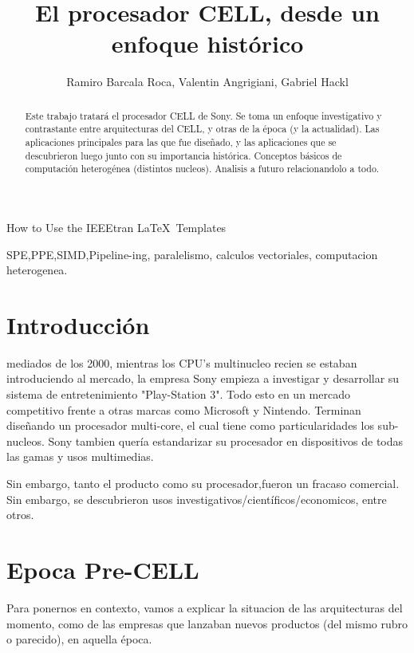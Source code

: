 \documentclass[10pt,compsoc]{IEEEtran}
\begin{document}
	\title{El procesador CELL, desde un enfoque
		histórico}
	\author{Ramiro Barcala Roca, Valentin Angrigiani, Gabriel Hackl}
		
	{How to Use the IEEEtran \LaTeX \ Templates}
	\maketitle
	
	\begin{abstract}
		Este trabajo tratará el procesador CELL de Sony. Se toma un enfoque investigativo y contrastante entre arquitecturas del CELL, y otras de la época (y la actualidad). Las aplicaciones principales para las que fue diseñado, y las aplicaciones que se descubrieron luego junto  con su importancia histórica. Conceptos básicos de computación heterogénea (distintos nucleos). Analisis a futuro relacionandolo a todo.
	\end{abstract}
	
	\begin{IEEEkeywords}
		SPE,PPE,SIMD,Pipeline-ing, paralelismo, calculos vectoriales, computacion heterogenea.
	\end{IEEEkeywords}
	
	\section{Introducción}
	 mediados de los 2000, mientras los CPU's multinucleo recien se estaban introduciendo al mercado, la empresa Sony empieza a investigar y desarrollar su sistema de entretenimiento "Play-Station 3". Todo esto en un mercado competitivo frente a otras marcas como Microsoft y Nintendo. Terminan diseñando un procesador multi-core, el cual tiene como particularidades los sub-nucleos. Sony tambien quería estandarizar su procesador en dispositivos de todas las gamas y usos multimedias.
	
	Sin embargo, tanto el producto como su procesador,fueron un fracaso comercial. Sin embargo, se descubrieron usos investigativos/científicos/economicos, entre otros.
	
	
	\section{Epoca Pre-CELL}
	\noindent Para ponernos en contexto, vamos a explicar la situacion de las arquitecturas del momento, como de las empresas que lanzaban nuevos productos (del mismo rubro o parecido), en aquella época.
	
\end{document}
